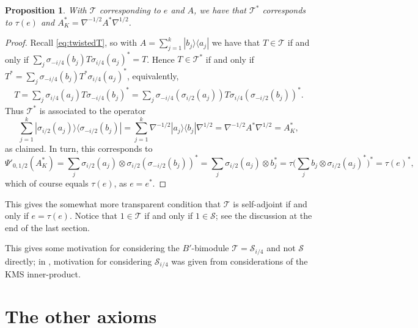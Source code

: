\documentclass[a4paper,11pt]{article}
\theoremstyle{plain}
\newtheorem{proposition}{Proposition}[section]
\theoremstyle{remark}
\newcommand{\mc}[1]{\mathcal{#1}}
\begin{document}
\begin{proposition}
With $\mc T$ corresponding to $e$ and $A$, we have that $\mc T^*$ corresponds to $\tau(e)$ and $A^*_K = \nabla^{-1/2} A^* \nabla^{1/2}$.
\end{proposition}
\begin{proof}
Recall \eqref{eq:twistedT}, so with $A = \sum_{j=1}^k | b_j \rangle \langle a_j |$ we have that $T\in\mc T$ if and only if $\sum_j \sigma_{-i/4}(b_j) T \sigma_{i/4}(a_j)^* = T$.  Hence $T\in\mc T^*$ if and only if $T^* = \sum_j \sigma_{-i/4}(b_j) T^* \sigma_{i/4}(a_j)^*$, equivalently,
\begin{align*}
T = \sum_j \sigma_{i/4}(a_j) T \sigma_{-i/4}(b_j)^*
= \sum_j \sigma_{-i/4}(\sigma_{i/2}(a_j)) T \sigma_{i/4}(\sigma_{-i/2}(b_j))^*  .
\end{align*}
Thus $\mc T^*$ is associated to the operator
\[ \sum_{j=1}^k | \sigma_{i/2}(a_j) \rangle \langle \sigma_{-i/2}(b_j) |
= \sum_{j=1}^k \nabla^{-1/2} |a_j\rangle \langle b_j| \nabla^{1/2} = \nabla^{-1/2} A^* \nabla^{1/2} = A^*_K, \]
as claimed.  In turn, this corresponds to
\[ \Psi'_{0,1/2}( A^*_K ) = \sum_j \sigma_{i/2}(a_j) \otimes \sigma_{i/2}(\sigma_{-i/2}(b_j))^* =  \sum_j \sigma_{i/2}(a_j) \otimes b_j^*
= \tau \Big( \sum_j b_j \otimes \sigma_{i/2}(a_j)^* \Big)^*
= \tau(e)^*, \]
which of course equals $\tau(e)$, as $e=e^*$.
\end{proof}

This gives the somewhat more transparent condition that $\mc T$ is self-adjoint if and only if $e = \tau(e)$.  Notice that $1\in\mc T$ if and only if $1\in\mc S$; see the discussion at the end of the last section.

This gives some motivation for considering the $B'$-bimodule $\mc T = \mc S_{i/4}$ and not $\mc S$ directly; in \cite{Wasilewski_Quantum_Cayley}, motivation for considering $\mc S_{i/4}$ was given from considerations of the KMS inner-product.



\section{The other axioms}
\end{document}
